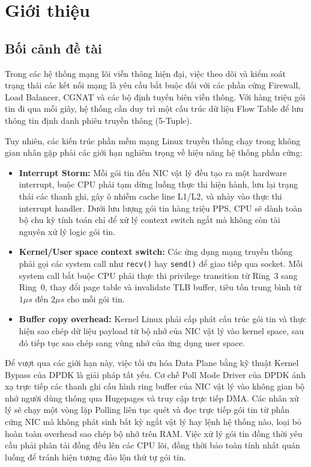 \documentclass[12pt,a4paper,twoside]{report}
\begin{document}
\newpage
\tableofcontents

\newpage
\listoffigures
\newpage
\listoftables

\newpage
{}

\chapter{Giới thiệu}

\section{Bối cảnh đề tài}
Trong các hệ thống mạng lõi viễn thông hiện đại, việc theo dõi và kiểm soát trạng thái các kết nối mạng là yêu cầu bắt buộc đối với các phần cứng Firewall, Load Balancer, CGNAT và các bộ định tuyến biên viễn thông. Với hàng triệu gói tin đi qua mỗi giây, hệ thống cần duy trì một cấu trúc dữ liệu Flow Table để lưu thông tin định danh phiên truyền thông (5-Tuple). 

Tuy nhiên, các kiến trúc phần mềm mạng Linux truyền thống chạy trong không gian nhân gặp phải các giới hạn nghiêm trọng về hiệu năng hệ thống phần cứng:
\begin{itemize}
    \item \textbf{Interrupt Storm:} Mỗi gói tin đến NIC vật lý đều tạo ra một hardware interrupt, buộc CPU phải tạm dừng luồng thực thi hiện hành, lưu lại trạng thái các thanh ghi, gây ô nhiễm cache line L1/L2, và nhảy vào thực thi interrupt handler. Dưới lưu lượng gói tin hàng triệu PPS, CPU sẽ dành toàn bộ chu kỳ tính toán chỉ để xử lý context switch ngắt mà không còn tài nguyên xử lý logic gói tin.
    \item \textbf{Kernel/User space context switch:} Các ứng dụng mạng truyền thống phải gọi các system call như \texttt{recv()} hay \texttt{send()} để giao tiếp qua socket. Mỗi system call bắt buộc CPU phải thực thi privilege transition từ Ring~3 sang Ring~0, thay đổi page table và invalidate TLB buffer, tiêu tốn trung bình từ $1\mu s$ đến $2\mu s$ cho mỗi gói tin.
    \item \textbf{Buffer copy overhead:} Kernel Linux phải cấp phát cấu trúc gói tin và thực hiện sao chép dữ liệu payload từ bộ nhớ của NIC vật lý vào kernel space, sau đó tiếp tục sao chép sang vùng nhớ của ứng dụng user space.
\end{itemize}

Để vượt qua các giới hạn này, việc tối ưu hóa Data Plane bằng kỹ thuật Kernel Bypass của DPDK là giải pháp tất yếu. Cơ chế Poll Mode Driver của DPDK ánh xạ trực tiếp các thanh ghi cấu hình ring buffer của NIC vật lý vào không gian bộ nhớ người dùng thông qua Hugepages và truy cập trực tiếp DMA. Các nhân xử lý sẽ chạy một vòng lặp Polling liên tục quét và đọc trực tiếp gói tin từ phần cứng NIC mà không phát sinh bất kỳ ngắt vật lý hay lệnh hệ thống nào, loại bỏ hoàn toàn overhead sao chép bộ nhớ trên RAM. Việc xử lý gói tin đồng thời yêu cầu phải phân tải đồng đều lên các CPU lõi, đồng thời bảo toàn tính nhất quán luồng để tránh hiện tượng đảo lộn thứ tự gói tin.
\end{document}
